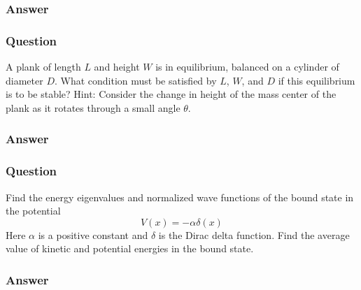 \subsubsection{Answer}



\subsubsection{Question}
A plank of length $L$ and height $W$ is in equilibrium, balanced on a cylinder of diameter $D$. What condition must be satisfied by $L$, $W$, and $D$ if this equilibrium is to be stable? Hint: Consider the change in height of the mass center of the plank as it rotates through a small angle $\theta$.
\subsubsection{Answer}

\subsubsection{Question}
Find the energy eigenvalues and normalized wave functions of the bound state in the potential
\begin{equation*}
	V(x) = -\alpha\delta(x)
\end{equation*}
Here $\alpha$ is a positive constant and $\delta$ is the Dirac delta function. Find the average value of kinetic and potential energies in the bound state.
\subsubsection{Answer}




